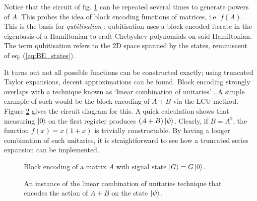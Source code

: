 \documentclass{article}
\begin{document}
Notice that the circuit of fig. \ref{fig:BE_A} can be repeated several times to generate powers of $A$. This probes the idea of block encoding functions of matrices, i.e. $f(A)$. This is the basis for \emph{qubitisation} \cite{LC19}; qubitisation uses a block encoded iterate in the eigenbasis of a Hamiltonian to craft Chebyshev polynomials on said Hamiltonian. The term qubitisation refers to the 2D space spanned by the states, reminiscent of eq. (\ref{eq:BE_states}).

It turns out not all possible functions can be constructed exactly; using truncated Taylor expansions, decent approximations can be found. Block encoding strongly overlaps with a technique known as `linear combination of unitaries' \cite{CW12}. A simple example of such would be the block encoding of $A + B$ via the \textsc{LCU} method. Figure \ref{fig:LCU} gives the circuit diagram for this. A quick calculation shows that measuring $\ket{0}$ on the first register produces $(A+B)\ket{\psi}$. Clearly, if $B=A^2$, the function $f(x)=x(1+x)$ is trivially constructable. By having a longer combination of such unitaries, it is straightforward to see how a truncated series expansion can be implemented.

\begin{figure}[!ht]
    \centering
    \caption{Block encoding of a matrix $A$ with signal state $\ket{G} = G\ket{0}$.}
    \label{fig:BE_A}
\end{figure}

\begin{figure}[!ht]
    \centering
    \caption{An instance of the linear combination of unitaries technique that encodes the action of $A+B$ on the state $\ket{\psi}$.}
    \label{fig:LCU}
\end{figure}
\end{document}
